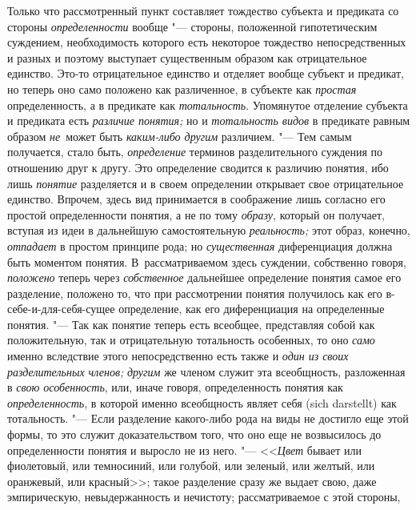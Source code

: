 Только что рассмотренный пункт составляет тождество субъекта и
предиката со стороны {\em определенности}
вообще "--- стороны, положенной гипотетическим
суждением, необходимость которого есть некоторое тождество непосредственных
и разных и поэтому выступает существенным образом как отрицательное
единство. Это-то отрицательное единство и отделяет вообще субъект и
предикат, но теперь оно само положено как различенное, в субъекте как
{\em простая} определенность, а в предикате как {\em тотальность}.
Упомянутое отделение субъекта и предиката есть {\em различие понятия;}
но и {\em тотальность видов} в предикате равным образом {\em не}~может быть
{\em каким-либо другим} различием. "--- Тем самым получается, стало быть,
{\em определение} терминов разделительного суждения по отношению друг к другу.
Это определение сводится к различию понятия, ибо лишь {\em понятие} разделяется
и в своем определении открывает свое отрицательное единство. Впрочем, здесь
вид принимается в соображение лишь согласно его простой определенности
понятия, а не по тому {\em образу}, который он получает, вступая из идеи
в дальнейшую самостоятельную {\em реальность;} этот образ, конечно,
{\em отпадает} в простом принципе рода; но {\em существенная}
диференциация должна быть моментом понятия. В~рассматриваемом здесь
суждении, собственно говоря, {\em положено} теперь через {\em собственное}
дальнейшее определение понятия самое его разделение, положено
то, что при рассмотрении понятия получилось как его в-себе-и-для-себя-сущее
определение, как его диференциация на определенные понятия. "---
Так как понятие теперь есть всеобщее, представляя собой как
положительную, так и отрицательную тотальность особенных, то оно
{\em само} именно вследствие этого непосредственно есть также и
{\em один из своих разделительных членов;} {\em другим} же
членом служит эта всеобщность, разложенная в {\em свою особенность},
или, иначе говоря, определенность понятия как {\em определенность}, в
которой именно всеобщность являет себя (sich darstellt) как
тотальность. "--- Если разделение какого-либо рода на виды не
достигло еще этой формы, то это служит доказательством того, что оно еще не
возвысилось до определенности понятия и выросло не из него. "---
<<{\em Цвет} бывает или фиолетовый, или темносиний, или голубой, или
зеленый, или желтый, или оранжевый, или красный>>;
такое разделение сразу же выдает свою, даже
эмпирическую, невыдержанность и нечистоту; рассматриваемое с этой стороны,
